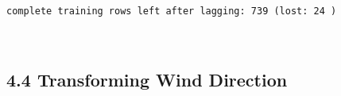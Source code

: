 \documentclass[11pt]{article}
\begin{document}
    \begin{Verbatim}[commandchars=\\\{\}]
complete training rows left after lagging: 739 (lost: 24 )

    \end{Verbatim}

    \begin{center}
    \end{center}
    { \hspace*{\fill} \\}
    
    \subsection{4.4 Transforming Wind
Direction}\label{transforming-wind-direction}
\end{document}

